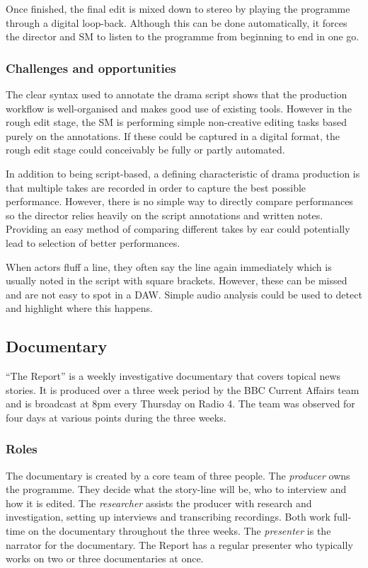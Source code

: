 Once finished, the final edit is mixed down to stereo by playing the programme through a digital loop-back. Although
this can be done automatically, it forces the director and SM to listen to the programme from beginning to end in one
go.

\subsubsection{Challenges and opportunities}
The clear syntax used to annotate the drama script shows that the production workflow is well-organised and makes good
use of existing tools. However in the rough edit stage, the SM is performing simple non-creative editing tasks based
purely on the annotations. If these could be captured in a digital format, the rough edit stage could conceivably be
fully or partly automated.

In addition to being script-based, a defining characteristic of drama production is that multiple takes are recorded in
order to capture the best possible performance. However, there is no simple way to directly compare performances so the
director relies heavily on the script annotations and written notes. Providing an easy method of comparing different
takes by ear could potentially lead to selection of better performances.

When actors fluff a line, they often say the line again immediately which is usually noted in the script with square
brackets. However, these can be missed and are not easy to spot in a DAW. Simple audio analysis could be used to detect
and highlight where this happens.

\subsection{Documentary}\label{sec:doc}
``The Report'' is a weekly investigative documentary that covers topical news stories. It is produced over a three week
period by the BBC Current Affairs team and is broadcast at 8pm every Thursday on Radio 4. The team was observed for
four days at various points during the three weeks.

\subsubsection{Roles}
The documentary is created by a core team of three people. The \textit{producer} owns the programme. They decide what
the story-line will be, who to interview and how it is edited. The \textit{researcher} assists the producer with
research and investigation, setting up interviews and transcribing recordings.  Both work full-time on the documentary
throughout the three weeks.  The \textit{presenter} is the narrator for the documentary.  The Report has a regular
presenter who typically works on two or three documentaries at once.

